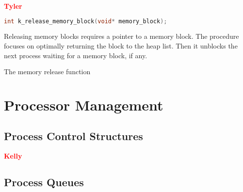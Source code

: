 \documentclass[12pt]{report}
\begin{document}
\textcolor{red}{\textbf{Tyler}} \\
\begin{minipage}{\textwidth}
\begin{lstlisting}[language=C, frame=single]
int k_release_memory_block(void* memory_block);
\end{lstlisting}
\end{minipage}

Releasing memory blocks requires a pointer to a memory block. The procedure focuses on optimally returning the block to the heap list. Then it unblocks the next process waiting for a memory block, if any.

\begin{algorithm}
  \caption{The memory release function}
  \begin{algorithmic}[1]
	  \EndIf
	  \EndIf
	  \EndIf
	  \EndIf
    \EndProcedure
  \end{algorithmic}
\end{algorithm}




\section{Processor Management}

\subsection{Process Control Structures}

\textcolor{red}{\textbf{Kelly}} \\

\subsection{Process Queues}
\end{document}
